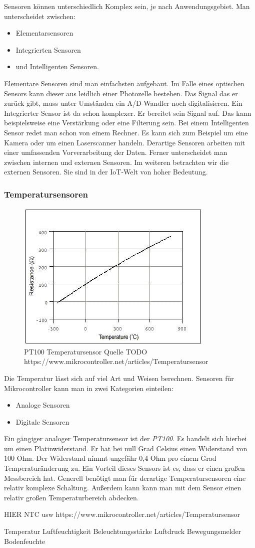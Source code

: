 Sensoren können unterschiedlich Komplex sein, je nach Anwendungsgebiet. Man unterscheidet zwischen:
\begin{itemize}
\item Elementarsensoren
\item Integrierten Sensoren
\item und Intelligenten Sensoren.
\end{itemize}

Elementare Sensoren sind man einfachsten aufgebaut. Im Falle eines optischen Sensors kann dieser aus leidlich einer Photozelle bestehen. Das Signal das er zurück gibt, muss unter Umständen ein A/D-Wandler noch digitalisieren. 
Ein Integrierter Sensor ist da schon komplexer. Er bereitet sein Signal auf. Das kann beispielsweise eine Verstärkung oder eine Filterung sein. Bei einem Intelligenten Sensor redet man schon von einem Rechner. Es kann sich zum Beispiel um eine Kamera oder um einen Laserscanner handeln. Derartige Sensoren arbeiten mit einer umfassenden Vorverarbeitung der Daten. 
Ferner unterscheidet man zwischen internen und externen Sensoren. Im weiteren betrachten wir die externen Sensoren. Sie sind in der IoT-Welt von hoher Bedeutung.

\subsubsection{Temperatursensoren}
\begin{figure}
\includegraphics[scale=1]{bilder/pt100} 
\caption{PT100 Temperatursensor Quelle TODO https://www.mikrocontroller.net/articles/Temperatursensor }
\label{PT100}
\end{figure}
Die Temperatur lässt sich auf viel Art und Weisen berechnen. Sensoren für Mikrocontroller kann man in zwei Kategorien einteilen:
\begin{itemize}
\item Analoge Sensoren
\item Digitale Sensoren
\end{itemize}
Ein gängiger analoger Temperatursensor ist der \textit{PT100}. Es handelt sich hierbei um einen Platinwiderstand. Er hat bei null Grad Celsius einen Widerstand von 100 Ohm. Der Widerstand nimmt ungefähr 0,4 Ohm pro einem Grad Temperaturänderung zu. Ein Vorteil dieses Sensors ist es, dass er einen großen Messbereich hat. Generell benötigt man für derartige Temperatursensoren eine relativ komplexe Schaltung. Außerdem kann kann man mit dem Sensor einen relativ großen Temperaturbereich abdecken.

HIER NTC usw
https://www.mikrocontroller.net/articles/Temperatursensor



Temperatur
Luftfeuchtigkeit
Beleuchtungsstärke
Luftdruck
Bewegungsmelder
Bodenfeuchte

 
